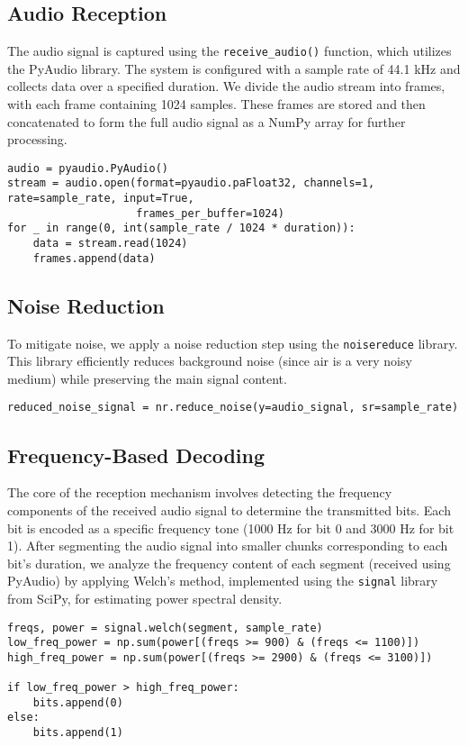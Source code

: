 \documentclass[11pt]{article}
\begin{document}
\subsection{Audio Reception}
The audio signal is captured using the \texttt{receive\_audio()} function, which utilizes the PyAudio library. The system is configured with a sample rate of 44.1 kHz and collects data over a specified duration. We divide the audio stream into frames, with each frame containing 1024 samples. These frames are stored and then concatenated to form the full audio signal as a NumPy array for further processing.
\begin{tcolorbox}[colback=black!10!white, colframe=black]
\begin{verbatim}
audio = pyaudio.PyAudio()
stream = audio.open(format=pyaudio.paFloat32, channels=1, rate=sample_rate, input=True, 
                    frames_per_buffer=1024)
for _ in range(0, int(sample_rate / 1024 * duration)): 
    data = stream.read(1024) 
    frames.append(data)
\end{verbatim}
\end{tcolorbox}
\subsection{Noise Reduction}
To mitigate noise, we apply a noise reduction step using the \texttt{noisereduce} library. This library efficiently reduces background noise (since air is a very noisy medium) while preserving the main signal content. 
\begin{tcolorbox}[colback=black!10!white, colframe=black]
\begin{verbatim}
reduced_noise_signal = nr.reduce_noise(y=audio_signal, sr=sample_rate)
\end{verbatim}
\end{tcolorbox}


\subsection{Frequency-Based Decoding}

The core of the reception mechanism involves detecting the frequency components of the received audio signal to determine the transmitted bits. Each bit is encoded as a specific frequency tone (1000 Hz for bit 0 and 3000 Hz for bit 1). After segmenting the audio signal into smaller chunks corresponding to each bit's duration, we analyze the frequency content of each segment (received using PyAudio) by applying Welch's method, implemented using the \texttt{signal} library from SciPy, for estimating power spectral density.
\begin{tcolorbox}[colback=black!10!white, colframe=black]
    
\begin{verbatim} 
freqs, power = signal.welch(segment, sample_rate) 
low_freq_power = np.sum(power[(freqs >= 900) & (freqs <= 1100)])
high_freq_power = np.sum(power[(freqs >= 2900) & (freqs <= 3100)])

if low_freq_power > high_freq_power: 
    bits.append(0) 
else: 
    bits.append(1) \end{verbatim}
\end{tcolorbox}
\end{document}
